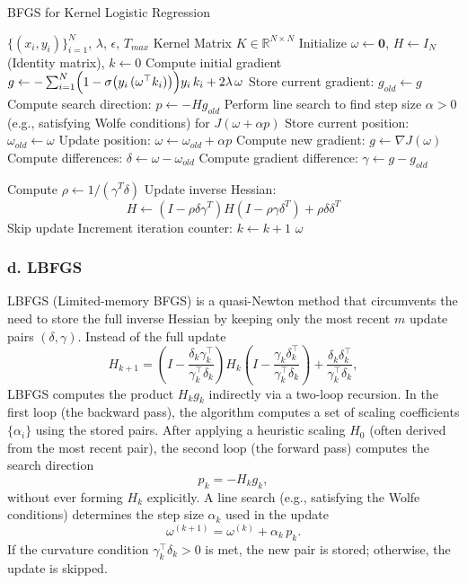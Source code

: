 \documentclass{article}
\begin{document}
\begin{algorithm}[H]
  \caption{BFGS for Kernel Logistic Regression}
  \begin{algorithmic}[1]
    \Require $\{(x_i,y_i)\}_{i=1}^N$, $\lambda$, $\epsilon$, $T_{max}$
    \Require Kernel Matrix $K \in \mathbb{R}^{N \times N}$
    \State Initialize $\omega \gets \mathbf{0}$, $H \gets I_N$ (Identity matrix), $k \gets 0$
    \State Compute initial gradient $g \gets -\sum_{i=1}^{N} \Bigl(1 - \sigma\bigl(y_i\,(\omega^\top k_i)\bigr)\Bigr)y_i\,k_i + 2\lambda\,\omega$
    \Repeat
        \State Store current gradient: $g_{old} \gets g$
        \State Compute search direction: $p \gets -H g_{old}$
        \State Perform line search to find step size $\alpha > 0$ (e.g., satisfying Wolfe conditions) for $J(\omega + \alpha p)$
        \State Store current position: $\omega_{old} \gets \omega$
        \State Update position: $\omega \gets \omega_{old} + \alpha p$
        \State Compute new gradient: $g \gets \nabla J(\omega)$ 
        \State Compute differences: $\delta \gets \omega - \omega_{old}$
        \State Compute gradient difference: $\gamma \gets g - g_{old}$

         
            \State Compute $\rho \gets 1 / (\gamma^T \delta)$
            \State Update inverse Hessian:
            \[
              H \gets (I - \rho \delta \gamma^T) H (I - \rho \gamma \delta^T) + \rho \delta \delta^T
            \]
        \Else
            \State Skip update 
        \EndIf
        \State Increment iteration counter: $k \gets k + 1$
     
    \State \Return $\omega$
  \end{algorithmic}
\end{algorithm}
\subsubsection{d. LBFGS}
LBFGS (Limited-memory BFGS) is a quasi-Newton method that circumvents the need to store the full inverse Hessian by keeping only the most recent \(m\) update pairs \((\delta,\gamma)\). Instead of the full update
\[
H_{k+1} = \left(I - \frac{\delta_k\gamma_k^\top}{\gamma_k^\top\delta_k}\right)H_k\left(I - \frac{\gamma_k\delta_k^\top}{\gamma_k^\top\delta_k}\right)
+ \frac{\delta_k\delta_k^\top}{\gamma_k^\top\delta_k},
\]
LBFGS computes the product \(H_k g_k\) indirectly via a two-loop recursion. In the first loop (the backward pass), the algorithm computes a set of scaling coefficients \(\{\alpha_i\}\) using the stored pairs. After applying a heuristic scaling \(H_0\) (often derived from the most recent pair), the second loop (the forward pass) computes the search direction
\[
p_k = - H_k g_k,
\]
without ever forming \(H_k\) explicitly. A line search (e.g., satisfying the Wolfe conditions) determines the step size \(\alpha_k\) used in the update
\[
\omega^{(k+1)} = \omega^{(k)} + \alpha_k \, p_k.
\]
If the curvature condition \(\gamma_k^\top\delta_k > 0\) is met, the new pair is stored; otherwise, the update is skipped.
\end{document}
